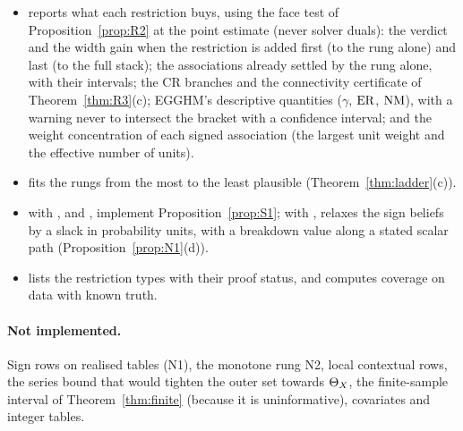 \begin{itemize}
\item {} reports what each restriction buys, using the face test
of Proposition~\ref{prop:R2} at the point estimate (never solver duals): the
verdict and the width gain when the restriction is added first (to the rung alone)
and last (to the full stack); the associations already settled by the rung
alone, with their intervals; the CR branches and the connectivity certificate of
Theorem~\ref{thm:R3}(c); EGGHM's descriptive quantities ($\gamma$, $\mathrm{ER}$, $\mathrm{NM}$),
with a warning never to intersect the bracket with a confidence interval; and the
weight concentration of each signed association (the largest unit weight and the
effective number of units).
\item {} fits the rungs from the most to the least plausible
(Theorem~\ref{thm:ladder}(c)).
\item {} with , and , implement
Proposition~\ref{prop:S1}; with ,  relaxes the sign
beliefs by a slack in probability units, with a breakdown value along a stated
scalar path (Proposition~\ref{prop:N1}(d)).
\item {} lists the restriction types with their proof status, and
 computes coverage on data with known truth.
\end{itemize}

\paragraph{Not implemented.} Sign rows on realised tables (N1), the monotone rung
N2, local contextual rows, the series bound that would tighten the outer set
towards $\Theta_X$, the finite-sample interval of Theorem~\ref{thm:finite} (because it is
uninformative), covariates and integer tables.
